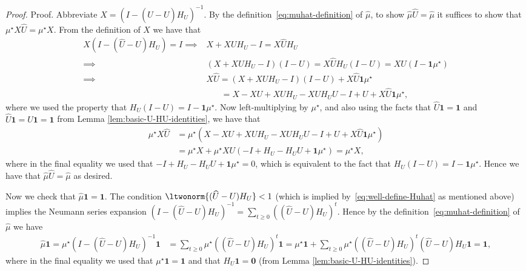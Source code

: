 \documentclass[mnsc,nonblindrev]{informs3}
\newcommand{\one}{\mathbf{1}}
\newcommand{\zero}{\mathbf{0}}
\newcommand{\muhat}{\widehat{\mu}}
\newcommand{\uhat}{\widehat{U}}
\begin{document}
\begin{APPENDICES}
\begin{proof}{Proof.}
    Abbreviate $X = (I - (\uhat - U)H_U)^{-1}$. By the definition~\eqref{eq:muhat-definition} of $\muhat$, to show $\muhat \uhat = \muhat$ it suffices to show that
        $
            \mu^\star X \uhat = \mu^\star X.
        $
        From the definition of $X$ we have that
        \begin{align*}
            X (I - (\uhat - U)H_U) = I 
            \implies &  X + XUH_U - I = X \uhat H_U \\
            \implies & (X + XUH_U - I)(I-U) = X \uhat H_U(I-U) = X\uhat (I - \one \mu^\star) \\
            \implies & X\uhat = (X + XUH_U - I)(I-U) + X\uhat \one \mu^\star \\
            & \quad\;\;\, = X - XU+XUH_U - XUH_U U - I + U + X\uhat \one \mu^\star,
        \end{align*}
        where we used the property that $H_U(I-U) = I - \one \mu^\star$.
        Now left-multiplying by $\mu^\star$, and also using the facts that $\uhat \one = \one$ and $\uhat\one = U\one = \one$ from Lemma \ref{lem:basic-U-HU-identities}, we have that
        \begin{align*}
            \mu^\star X \uhat 
            &= \mu^\star \left( X - XU+XUH_U - XUH_U U - I + U + X\uhat \one \mu^\star\right) \\
            &= \mu^\star X + \mu^\star XU (-I + H_U -  H_UU + \one \mu^\star) 
            = \mu^\star X,
        \end{align*}
        where in the final equality we used that $-I + H_U -  H_UU + \one \mu^\star = 0$, which is equivalent to the fact that $H_U(I - U) = I - \one \mu^\star$.
        Hence we have that $\muhat \uhat = \muhat$ as desired.

        Now we check that $\muhat \one = \one$. The condition $\ltwonorm{(\uhat-U)H_U}< 1$ (which is implied by~\eqref{eq:well-define-Huhat} as mentioned above) implies the Neumann series expansion $(I - (\uhat-U)H_U)^{-1} = \sum_{t \geq 0} ((\uhat-U)H_U)^t$. Hence by the definition~\eqref{eq:muhat-definition} of $\muhat$ we have
        \begin{align*}
            \muhat \one 
            = \mu^\star (I - (\uhat-U)H_U)^{-1} \one 
            &= \sum_{t \geq 0} \mu^\star ((\uhat-U)H_U)^t \one = \mu^\star \one + \sum_{t \geq 0} \mu^\star ((\uhat-U)H_U)^t (\uhat-U)H_U \one 
            = \one ,
        \end{align*}
        where in the final equality we used that $\mu^\star \one = \one$ and that $H_U \one = \zero$ (from Lemma \ref{lem:basic-U-HU-identities}).


\end{proof}
\end{APPENDICES}
\end{document}
